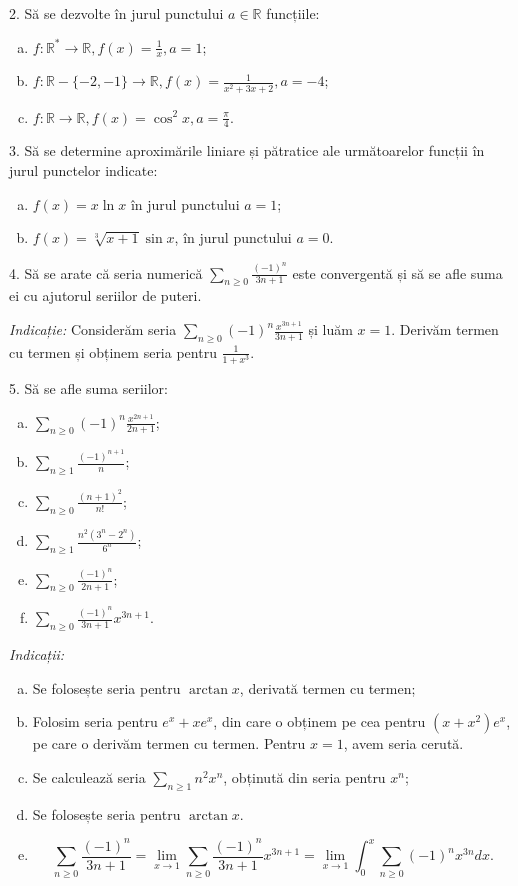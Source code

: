 \documentclass[11pt,a4paper]{article}
\newcommand\ds{\displaystyle}
\newcommand\RR{\mathbb{R}}
\theoremstyle{dotless}
\theoremstyle{dotlessdr}
\begin{document}
2. Să se dezvolte în jurul punctului $a \in \RR$ funcțiile:
\begin{enumerate}[(a)]
\item $f: \RR^\ast \to \RR, f(x) = \frac{1}{x}, a = 1$;
\item $f: \RR - \{-2, -1\} \to \RR, f(x) = \frac{1}{x^2 + 3x + 2}, a = -4$;
\item $f: \RR \to \RR, f(x) = \cos^2 x, a = \frac{\pi}{4}$.
\end{enumerate}

\vspace{1cm}

3. Să se determine aproximările liniare și pătratice ale următoarelor
funcții în jurul punctelor indicate:
\begin{enumerate}[(a)]
\item $f(x) = x \ln x$ în jurul punctului $a = 1$;
\item $f(x) = \sqrt[3]{x + 1} \sin x$, în jurul punctului $a = 0$.
\end{enumerate}

\vspace{1cm}

4. Să se arate că seria numerică $\ds\sum_{n \geq 0} \frac{(-1)^n}{3n + 1}$ este
convergentă și să se afle suma ei cu ajutorul seriilor de puteri.

\emph{Indicație:} Considerăm seria $\ds\sum_{n \geq 0} (-1)^n \frac{x^{3n+1}}{3n + 1}$
și luăm $x = 1$. Derivăm termen cu termen și obținem seria pentru $\frac{1}{1 + x^3}$.

\vspace{1cm}

5. Să se afle suma seriilor:
\begin{enumerate}[(a)]
\item $\ds\sum_{n \geq 0} (-1)^n \frac{x^{2n+1}}{2n + 1}$;
\item $\ds\sum_{n \geq 1} \frac{(-1)^{n+1}}{n}$;
\item $\ds\sum_{n \geq 0} \frac{(n + 1)^2}{n!}$;
\item $\ds\sum_{n \geq 1} \frac{n^2(3^n - 2^n)}{6^n}$;
\item $\ds\sum_{n \geq 0} \frac{(-1)^n}{2n + 1}$;
\item $\sum_{n \geq 0} \frac{(-1)^n}{3n + 1} x^{3n+1}$.
\end{enumerate}

\emph{Indicații:}
\begin{enumerate}[(a)]
\item Se folosește seria pentru $\arctan x$, derivată termen cu termen;
\item Folosim seria pentru $e^x + xe^x$, din care o obținem pe cea pentru
  $(x + x^2)e^x$, pe care o derivăm termen cu termen. Pentru $x = 1$, avem
  seria cerută.
\item Se calculează seria $\ds\sum_{n \geq 1} n^2 x^n$, obținută din seria
  pentru $x^n$;
\item Se folosește seria pentru $\arctan x$.
\item
  \[
    \sum_{n \geq 0} \frac{(-1)^n}{3n + 1} = %
    \lim_{x \to 1} \sum_{n \geq 0} \frac{(-1)^n}{3n + 1} x^{3n + 1} = %
    \lim_{x \to 1} \int_0^x \sum_{n \geq 0} (-1)^n x^{3n} dx.
  \]
\end{enumerate}
\end{document}
